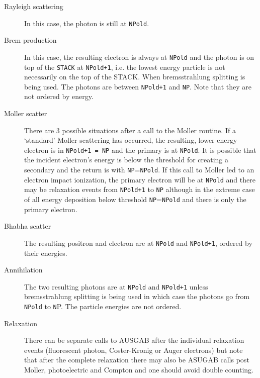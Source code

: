 \begin{description}
\item[Rayleigh scattering] In this case, the photon is still at
\verb^NPold^.

\item[Brem production] In this case, the resulting electron is
always at \verb^NPold^ and the photon is on top of the {\tt STACK} at \verb^NPold+1^, i.e. the
lowest energy particle is not necessarily on the top of the STACK. When
bremsstrahlung splitting is being used. The photons are between
\verb^NPold+1^ and
\verb^NP^. Note that they are not ordered by energy.

\item[Moller scatter] There are 3 possible situations after a call to the
Moller routine. If a `standard' Moller scattering has occurred, the
resulting, lower energy electron is in \verb^NPold+1 = NP^ and the primary
is at \verb^NPold^. It is possible
that the incident electron's energy is below the threshold for creating a
secondary and the return is with \verb^NP^=\verb^NPold^. If this call to
Moller led to an electron impact ionization, the primary electron will be
at \verb^NPold^ and there may be relaxation events
from  \verb^NPold+1^ to \verb^NP^ although in the extreme case of all energy
deposition below threshold \verb^NP^=\verb^NPold^ and there is only the
primary electron.

\item[Bhabha scatter] The resulting positron and electron are at
\verb^NPold^ and
\verb^NPold+1^, ordered by their energies.

\item[Annihilation] The two resulting photons are at \verb^NPold^ and
\verb^NPold+1^
unless bremsstrahlung splitting is being used in which case the photons go
from \verb^NPold^ to \verb^N^P. The particle energies are not ordered.

\item[Relaxation] There can be separate calls to AUSGAB after the
individual relaxation events (fluorescent photon, Coster-Kronig or Auger
electrons) but note that after the complete relaxation there may also be
ASUGAB calls post Moller, photoelectric and Compton and one should avoid
double counting.

\end{description}

